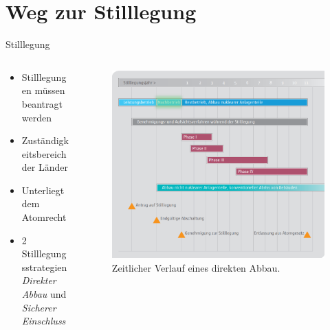 \section{Weg zur Stilllegung}



\begin{frame}{ Stilllegung }
   \begin{columns}

    \begin{column}{0.48\textwidth}
      \begin{itemize}
       \setlength\itemsep{1.2em}
         \item{ Stilllegungen müssen beantragt werden}
         \item{ Zuständigkeitsbereich der Länder}
         \item{ Unterliegt dem Atomrecht}
         \item{ 2 Stilllegungsstrategien \\ \emph{Direkter Abbau} und \emph{Sicherer Einschluss} }
      \end{itemize}
    \end{column}

    \begin{column}{0.48\textwidth}
      \begin{figure}
        \centering
        \includegraphics[width=1.05\textwidth]{./bilder/stilllegung_nachbetrieb.pdf}
        \caption{ Zeitlicher Verlauf eines direkten Abbau\cite{stilllegung_grs}. }
        \label{ fig: stillegung }
      \end{figure}
    \end{column}

  \end{columns}
\end{frame}



